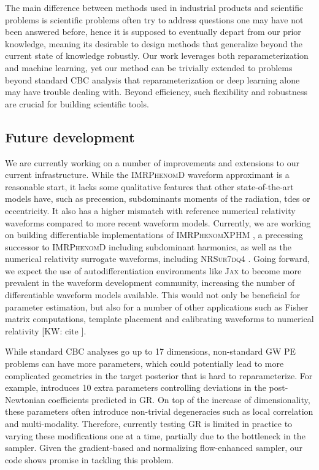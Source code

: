 \documentclass[twocolumn]{aastex631}
\newcommand{\kw}[1]{{\color{rb4}[KW: #1 ]}}
\begin{document}
The main difference between methods used in industrial products and scientific
problems is scientific problems often try to address questions one may have not
been answered before, hence it is supposed to eventually depart from our prior
knowledge, meaning its desirable to design methods that generalize beyond the
current state of knowledge robustly. Our work leverages both reparameterization
and machine learning, yet our method can be trivially extended to problems
beyond standard CBC analysis that reparameterization or deep learning alone may
have trouble dealing with. Beyond efficiency, such flexibility and robustness
are crucial for building scientific tools.

\subsection{Future development}

We are currently working on a number of improvements and extensions to our
current infrastructure. While the \textsc{IMRPhenomD} waveform approximant is a
reasonable start, it lacks some qualitative features that other
state-of-the-art models have, such as precession, subdominants moments of the
radiation, tdes or eccentricity. It also has a higher mismatch with reference
numerical relativity waveforms compared to more recent waveform models.
Currently, we are working on building differentiable implementations of
\textsc{IMRPhenomXPHM} \cite{Pratten:2020ceb}, a precessing successor to
\textsc{IMRPhenomD} including subdominant harmonics, as well as the numerical
relativity surrogate waveforms, including \textsc{NRSur7dq4}
\cite{Varma:2018mmi}. Going forward, we expect the use of autodifferentiation
environments like \textsc{Jax} to become more prevalent in the waveform
development community, increasing the number of differentiable waveform models
available. This would not only be beneficial for parameter estimation, but also
for a number of other applications such as Fisher matrix computations, template
placement and calibrating waveforms to numerical relativity \kw{cite}.

While standard CBC analyses go up to 17 dimensions, non-standard GW PE problems
can have more parameters, which could potentially lead to more complicated
geometries in the target posterior that is hard to reparameterize. For example,
\cite{LIGOScientific:2021sio} introduces 10 extra parameters controlling
deviations in the post-Newtonian coefficients predicted in GR. On top of the
increase of dimensionality, these parameters often introduce non-trivial
degeneracies such as local correlation and multi-modality. Therefore, currently
testing GR is limited in practice to varying these modifications one at a time,
partially due to the bottleneck in the sampler.  Given the gradient-based and
normalizing flow-enhanced sampler, our code shows promise in tackling this
problem.
\end{document}
